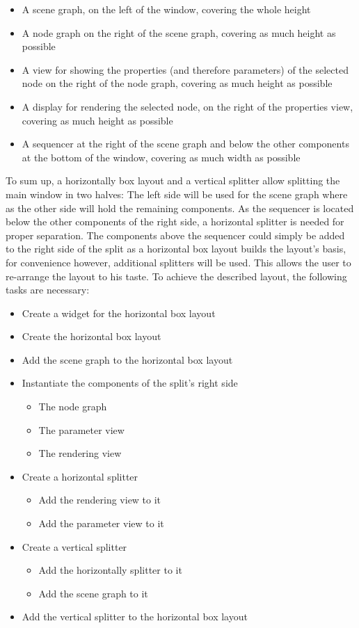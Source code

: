 \documentclass[10pt, openright, notitlepage]{scrreprt}
\begin{document}
\begin{itemize}
\item A scene graph, on the left of the window, covering the whole height
\item A node graph on the right of the scene graph, covering as much height as
possible
\item A view for showing the properties (and therefore parameters) of the selected
node on the right of the node graph, covering as much height as possible
\item A display for rendering the selected node, on the right of the properties
view, covering as much height as possible
\item A sequencer at the right of the scene graph and below the other components at
the bottom of the window, covering as much width as possible
\end{itemize}

To sum up, a horizontally box layout and a vertical splitter allow splitting the
main window in two halves: The left side will be used for the scene graph where
as the other side will hold the remaining components. As the sequencer is
located below the other components of the right side, a horizontal splitter is
needed for proper separation. The components above the sequencer could simply be
added to the right side of the split as a horizontal box layout builds the
layout's basis, for convenience however, additional splitters will be used. This
allows the user to re-arrange the layout to his taste. To achieve the described
layout, the following tasks are necessary:

\begin{itemize}
\item Create a widget for the horizontal box layout
\item Create the horizontal box layout
\item Add the scene graph to the horizontal box layout
\item Instantiate the components of the split's right side
\begin{itemize}
\item The node graph
\item The parameter view
\item The rendering view
\end{itemize}
\item Create a horizontal splitter
\begin{itemize}
\item Add the rendering view to it
\item Add the parameter view to it
\end{itemize}
\item Create a vertical splitter
\begin{itemize}
\item Add the horizontally splitter to it
\item Add the scene graph to it
\end{itemize}
\item Add the vertical splitter to the horizontal box layout
\end{itemize}
\end{document}
